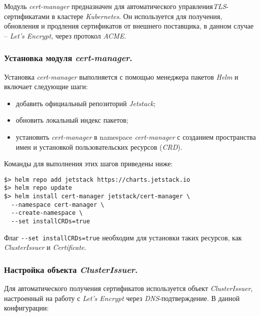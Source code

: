 Модуль \textit{cert-manager} предназначен для автоматического управления\textit{TLS}-сертификатами в кластере \textit{Kubernetes}. Он используется для получения, обновления и продления сертификатов от внешнего поставщика, в данном случае -- \textit{Let's Encrypt}, через протокол \textit{ACME}.

\subsubsection{Установка модуля \textit{cert-manager}.} Установка \textit{cert-manager} выполняется с помощью менеджера пакетов \textit{Helm} и включает следующие шаги:

\begin{itemize}
    \item добавить официальный репозиторий \textit{Jetstack};
    \item обновить локальный индекс пакетов;
    \item установить \textit{cert-manager} в namespace \textit{cert-manager} с созданием пространства имен и установкой пользовательских ресурсов (\textit{CRD}).
\end{itemize}

Команды для выполнения этих шагов приведены ниже:

\begin{lstlisting}
$> helm repo add jetstack https://charts.jetstack.io
$> helm repo update
$> helm install cert-manager jetstack/cert-manager \
  --namespace cert-manager \
  --create-namespace \
  --set installCRDs=true
\end{lstlisting}

Флаг \lstinline|--set installCRDs=true| необходим для установки таких ресурсов, как \textit{ClusterIssuer} и \textit{Certificate}.


\subsubsection{Настройка объекта \textit{ClusterIssuer}.} Для автоматического получения сертификатов используется объект \textit{ClusterIssuer}, настроенный на работу с \textit{Let's Encrypt} через \textit{DNS}-подтверждение. В данной конфигурации:


